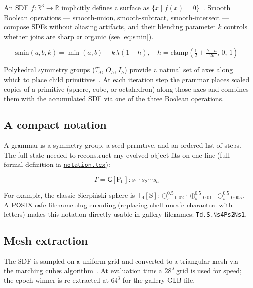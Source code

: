 \documentclass[11pt, a4paper]{article}
\newcommand{\code}[1]{\texttt{#1}}
\begin{document}
An SDF $f : \mathbb{R}^3 \to \mathbb{R}$ implicitly defines a surface as
$\{x \mid f(x) = 0\}$~\cite{quilez_sdf}.
Smooth Boolean operations — smooth-union, smooth-subtract, smooth-intersect
— compose SDFs without aliasing artifacts, and their blending parameter $k$
controls whether joins are sharp or organic (see \autoref{eq:smin}).

\begin{equation}
  \label{eq:smin}
  \mathrm{smin}(a,b,k) =
    \min(a,b) - k\,h(1-h), \quad
    h = \mathrm{clamp}\!\left(\tfrac{1}{2} + \tfrac{b-a}{2k},\,0,\,1\right)
\end{equation}

Polyhedral symmetry groups ($T_d$, $O_h$, $I_h$) provide a natural set of
axes along which to place child primitives~\cite{coxeter1973regular}.
At each iteration step the grammar places scaled copies of a primitive
(sphere, cube, or octahedron) along those axes and combines them with
the accumulated SDF via one of the three Boolean operations.

\subsection{A compact notation}
\label{subsec:notation}

A grammar is a symmetry group, a seed primitive, and an ordered list of steps.
The full state needed to reconstruct any evolved object fits on one line
(full formal definition in \href{notation.pdf}{\code{notation.tex}}):

\begin{equation}
  \label{eq:grammar}
  \Gamma = \mathsf{G}[\mathrm{P_0}] : s_1 \cdot s_2 \cdots s_n
\end{equation}

For example, the classic Sierpi\'nski sphere is
$\mathsf{T_d}[\mathrm{S}]:\ominus_s^{0.5}{}_{0.02}\cdot\oplus_s^{0.5}{}_{0.01}\cdot\ominus_s^{0.5}{}_{0.005}$.
A POSIX-safe filename slug encoding (replacing shell-unsafe characters with
letters) makes this notation directly usable in gallery filenames:
\code{Td.S.Ns4Ps2Ns1}.

\subsection{Mesh extraction}
\label{subsec:mesh}

The SDF is sampled on a uniform grid and converted to a triangular mesh via
the marching cubes algorithm~\cite{lorensen1987marching}.
At evaluation time a $28^3$ grid is used for speed; the epoch winner is
re-extracted at $64^3$ for the gallery GLB file.
\end{document}

